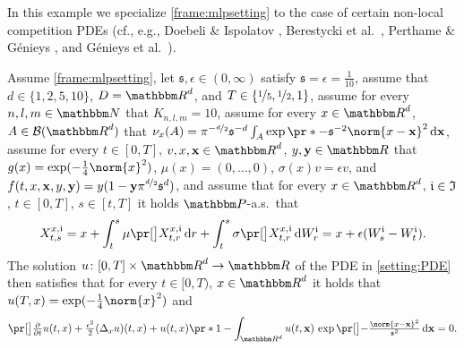 \begin{example}

	\label{exampleMLP:nonlocal_comp}
	In this example we specialize \cref{frame:mlpsetting} to the case of certain non-local competition PDEs (cf., e.g., Doebeli \& Ispolatov \citep{Doebeli2010}, Berestycki et al.~\citep{Berestycki2009b}, Perthame \& Génieys \citep{Perthame2007}, and Génieys et al.~\citep{Genieys2006a}).

	Assume 
		\cref{frame:mlpsetting},
	let
		$\mathfrak s,\epsilon\in(0,\infty)$
	satisfy 
		$\mathfrak{s} = \epsilon = \tfrac{1}{10}$,
	assume that
		$d\in\{1,2,5,10\}$,
		$D = \R^d$, and
		$T\in\{\nicefrac{1}{5},\nicefrac{1}{2},1\}$,
	assume for every 
		$n,l,m\in \N$ 
	that
		$K_{n,l,m} = 10$,
	assume for every
		$x \in \R^d$,
		$A \in \mathcal{B}(\R^d)$
	that
		$\nu_x(A) = \pi^{-\nicefrac{d}{2}}\mathfrak{s}^{-d}\int_A \exp\pr*{-\mathfrak{s}^{-2}\norm{x - \mathbf{x}}^2}\,\diff\mathbf{x}$,
	assume for every 
		$t \in [0,T]$,
		$v,x,\mathbf{x} \in \R^d$,
		$y,\mathbf{y} \in \R$
	that
		$g(x)= \exp (- \tfrac{1}{4}\norm{x}^2)$,
		$\mu(x)=(0,\dots,0)$,
		$\sigma(x) v = \epsilon v$, and
		$f(t,x,\mathbf{x},y,\mathbf{y})= y(1 -\mathbf{y}\pi^{\nicefrac{d}{2}}\mathfrak{s}^d)$,
	and	assume that for every 
		$x\in \R^{d}$, 
		$\mathfrak{i} \in \mathfrak{I}$, 
		$t\in [0,T]$, 
		$s\in [t,T]$ 
	it holds $\P$-a.s.\ that
	\begin{equation}
		X^{x,\dindex}_{t,s} 
		= 
		x + \int_{t}^{s} \mu\bpr{X^{x,\dindex}_{t,r}} \, \diff r + \int^{s}_{t} \sigma \bpr{X^{x,\dindex}_{t,r}} \, \diff W^{\dindex}_{r}
		=
		x+\epsilon(W^\dindex_s-W^\dindex_t)
		.
	\end{equation}
	The solution 
		$u\colon[0,T]\times \R^d \to \R$ 
		of the PDE in \eqref{setting:PDE} then satisfies that
	for every
		$t\in [0,T)$, 
		$x\in\R^d$
	it holds that
		$u(T,x) = \exp (-\tfrac{1}{4}\norm{x}^2)$ and
		\begin{equation}
			\label{eqMLP:nonlocalcompet}
			\bpr{\tfrac{\partial }{\partial t}u} (t,x) 
			+
			\tfrac{\epsilon^2}{2}(\Delta_x u) (t,x) 
			+ 
			u(t,x)\pr*{1 - \int_{\R^d} u(t,\mathbf{x})\,\exp\bpr{-\tfrac{\norm{x-\mathbf{x}}^2}{\mathfrak{s}^2}} \, \diff\mathbf{x} }
			=
			0
			.
	\end{equation}
\end{example}


